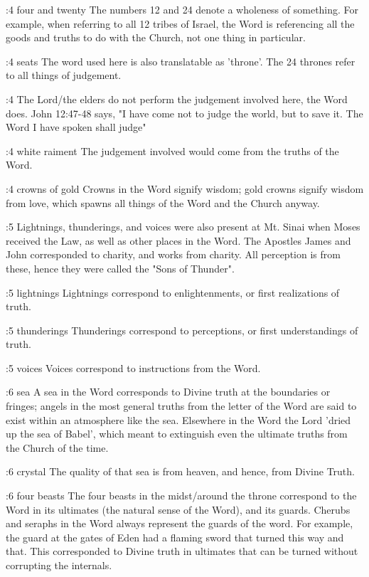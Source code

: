 :4 {four and twenty}
The numbers 12 and 24 denote a wholeness of something. For example, when referring to all 12 tribes of Israel, the Word is referencing all the goods and truths to do with the Church, not one thing in particular. 

:4 {seats}
The word used here is also translatable as 'throne'. The 24 thrones refer to all things of judgement.

:4 {}
The Lord/the elders do not perform the judgement involved here, the Word does. John 12:47-48 says, "I have come not to judge the world, but to save it. The Word I have spoken shall judge"

:4 {white raiment}
The judgement involved would come from the truths of the Word.

:4 {crowns of gold}
Crowns in the Word signify wisdom; gold crowns signify wisdom from love, which spawns all things of the Word and the Church anyway.

:5 {}
Lightnings, thunderings, and voices were also present at Mt. Sinai when Moses received the Law, as well as other places in the Word. The Apostles James and John corresponded to charity, and works from charity. All perception is from these, hence they were called the "Sons of Thunder".

:5 {lightnings}
Lightnings correspond to enlightenments, or first realizations of truth.

:5 {thunderings}
Thunderings correspond to perceptions, or first understandings of truth.

:5 {voices}
Voices correspond to instructions from the Word.

:6 {sea}
A sea in the Word corresponds to Divine truth at the boundaries or fringes; angels in the most general truths from the letter of the Word are said to exist within an atmosphere like the sea. Elsewhere in the Word the Lord 'dried up the sea of Babel', which meant to extinguish even the ultimate truths from the Church of the time.

:6 {crystal}
The quality of that sea is from heaven, and hence, from Divine Truth.

:6 {four beasts}
The four beasts in the midst/around the throne correspond to the Word in its ultimates (the natural sense of the Word), and its guards. Cherubs and seraphs in the Word always represent the guards of the word. For example, the guard at the gates of Eden had a flaming sword that turned this way and that. This corresponded to Divine truth in ultimates that can be turned without corrupting the internals.

